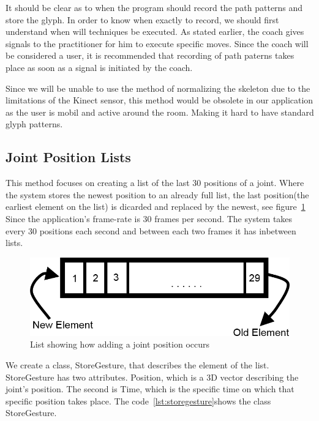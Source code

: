 It should be clear as to when the program should record the path patterns and store the glyph. In order to know when exactly to record, we should first understand when will techniques be executed. As stated earlier, the coach gives signals to the practitioner for him to execute specific moves. Since the coach will be considered a user, it is recommended that recording of path paterns takes place as soon as a signal is initiated by the coach.

Since we will be unable to use the method of normalizing the skeleton due to the limitations of the Kinect sensor, this method would be obsolete in our application as the user is mobil and active around the room. Making it hard to have standard glyph patterns.

\subsection{Joint Position Lists}
This method focuses on creating a list of the last 30 positions of a joint. Where the system stores the newest position to an already full list, the last position(the earliest element on the list) is dicarded and replaced by the newest, see figure~\ref{stack}
Since the application's frame-rate is 30 frames per second. The system takes every 30 positions each second and between each two frames it has inbetween lists.
\begin{figure}[!htbp]
\centering
\includegraphics[width=1\textwidth]{images/stack.png}
\caption{List showing how adding a joint position occurs}
\label{stack}
\end{figure}

We create a class, StoreGesture, that describes the element of the list. StoreGesture has two attributes. Position, which is a 3D vector describing the joint's position. The second is Time, which is the specific time on which that specific position takes place. The code~\ref{lst:storegesture}shows the class StoreGesture.



